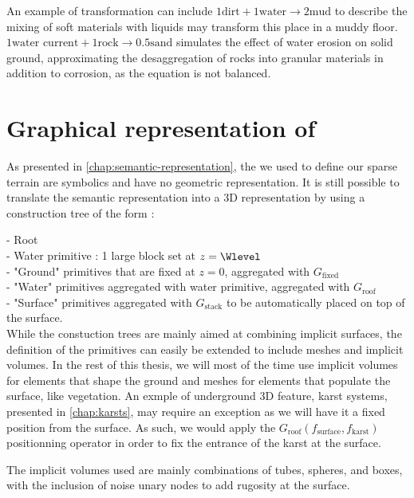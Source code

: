 An example of transformation can include $1 \text{dirt} + 1 \text{water} \to 2 \text{mud}$ to describe the mixing of soft materials with liquids may transform this place in a muddy floor. $1 \text{water current} + 1 \text{rock} \to 0.5 \text{sand}$ simulates the effect of water erosion on solid ground, approximating the desaggregation of rocks into granular materials in addition to corrosion, as the equation is not balanced. 

\section{Graphical representation of }
\label{sec:volumic-modeling_graphic-representation-env-objects}

As presented in \cref{chap:semantic-representation}, the  we used to define our sparse terrain are symbolics and have no geometric representation. It is still possible to translate the semantic representation into a 3D representation by using a construction tree of the form :

- Root \\
- Water primitive : 1 large block set at $z = \Wlevel$ \\
- "Ground" primitives that are fixed at $z = 0$, aggregated with $G_\text{fixed}$ \\
- "Water" primitives aggregated with water primitive, aggregated with $G_\text{roof}$ \\
- "Surface" primitives aggregated with $G_\text{stack}$ to be automatically placed on top of the surface. \\

While the constuction trees are mainly aimed at combining implicit surfaces, the definition of the primitives can easily be extended to include meshes and implicit volumes. In the rest of this thesis, we will most of the time use implicit volumes for elements that shape the ground and meshes for elements that populate the surface, like vegetation. An exmple of underground 3D feature, karst systems, presented in \cref{chap:karsts}, may require an exception as we will have it a fixed position from the surface. As such, we would apply the $G_\text{roof}(f_\text{surface}, f_\text{karst})$ positionning operator in order to fix the entrance of the karst at the surface.

The implicit volumes used are mainly combinations of tubes, spheres, and boxes, with the inclusion of noise unary nodes to add rugosity at the surface.